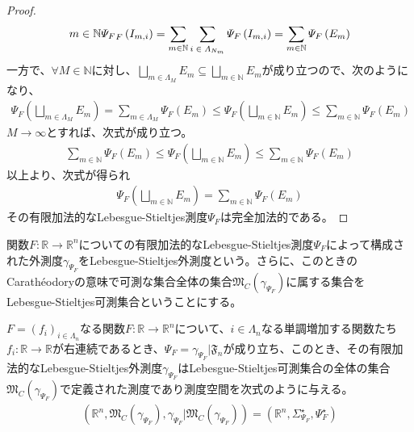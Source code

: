 \documentclass[dvipdfmx]{jsarticle}
\begin{document}
\begin{proof}
\begin{align*}
{\begin{matrix}
m \in \mathbb{N} \\
\end{matrix}} {{\varPsi_{F}}_{F}\left( I_{m,i} \right)} = \sum_{m \in \mathbb{N}} {\sum_{\scriptsize \begin{matrix}
i \in \varLambda_{N_{m}} \\
\end{matrix}} {\varPsi_{F}\left( I_{m,i} \right)}} = \sum_{m \in \mathbb{N}} {\varPsi_{F}\left( E_{m} \right)}
\end{align*}
一方で、$\forall M \in \mathbb{N}$に対し、$\bigsqcup_{m \in \varLambda_{M}} E_{m} \subseteq \bigsqcup_{m \in \mathbb{N}} E_{m}$が成り立つので、次のようになり、
\begin{align*}
\varPsi_{F}\left( \bigsqcup_{m \in \varLambda_{M}} E_{m} \right) = \sum_{m \in \varLambda_{M}} {\varPsi_{F}\left( E_{m} \right)} \leq \varPsi_{F}\left( \bigsqcup_{m \in \mathbb{N}} E_{m} \right) \leq \sum_{m \in \mathbb{N}} {\varPsi_{F}\left( E_{m} \right)}
\end{align*}
$M \rightarrow \infty$とすれば、次式が成り立つ。
\begin{align*}
\sum_{m \in \mathbb{N}} {\varPsi_{F}\left( E_{m} \right)} \leq \varPsi_{F}\left( \bigsqcup_{m \in \mathbb{N}} E_{m} \right) \leq \sum_{m \in \mathbb{N}} {\varPsi_{F}\left( E_{m} \right)}
\end{align*}
以上より、次式が得られ
\begin{align*}
\varPsi_{F}\left( \bigsqcup_{m \in \mathbb{N}} E_{m} \right) = \sum_{m \in \mathbb{N}} {\varPsi_{F}\left( E_{m} \right)}
\end{align*}
その有限加法的なLebesgue-Stieltjes測度$\varPsi_{F}$は完全加法的である。
\end{proof}
\begin{dfn}
関数$F:\mathbb{R} \rightarrow \mathbb{R}^{n}$についての有限加法的なLebesgue-Stieltjes測度$\varPsi_{F}$によって構成された外測度$\gamma_{\varPsi_{F}}$をLebesgue-Stieltjes外測度という。さらに、このときのCarathéodoryの意味で可測な集合全体の集合$\mathfrak{M}_{C}\left( \gamma_{\varPsi_{F}} \right)$に属する集合をLebesgue-Stieltjes可測集合ということにする。
\end{dfn}
\begin{thm}\label{4.5.4.6}
$F = \left( f_{i} \right)_{i \in \varLambda_{n}}$なる関数$F:\mathbb{R} \rightarrow \mathbb{R}^{n}$について、$i \in \varLambda_{n}$なる単調増加する関数たち$f_{i}:\mathbb{R} \rightarrow \mathbb{R}$が右連続であるとき、$\varPsi_{F} = \gamma_{\varPsi_{F}}|\mathfrak{F}_{n}$が成り立ち、このとき、その有限加法的なLebesgue-Stieltjes外測度$\gamma_{\varPsi_{F}}$はLebesgue-Stieltjes可測集合の全体の集合$\mathfrak{M}_{C}\left( \gamma_{\varPsi_{F}} \right)$で定義された測度であり測度空間を次式のように与える。
\begin{align*}
\left( \mathbb{R}^{n},\mathfrak{M}_{C}\left( \gamma_{\varPsi_{F}} \right),\gamma_{\varPsi_{F}}|\mathfrak{M}_{C}\left( \gamma_{\varPsi_{F}} \right) \right) = \left( \mathbb{R}^{n},\varSigma_{\varPsi_{F}}^{\star},\varPsi_{F}^{\star} \right)
\end{align*}
\end{thm}
\end{document}
